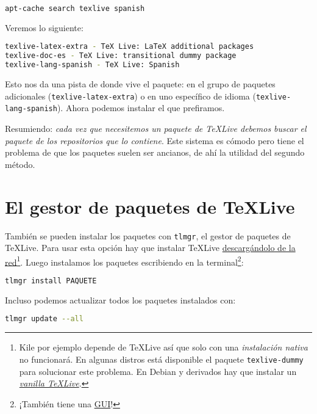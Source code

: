 \begin{lstlisting}[language=bash]
apt-cache search texlive spanish
\end{lstlisting}

Veremos lo siguiente:

\begin{lstlisting}[language=bash]
texlive-latex-extra - TeX Live: LaTeX additional packages
texlive-doc-es - TeX Live: transitional dummy package
texlive-lang-spanish - TeX Live: Spanish
\end{lstlisting}

Esto nos da una pista de donde vive el paquete: en el grupo de paquetes
adicionales (\lstinline!texlive-latex-extra!) o en uno específico de
idioma (\lstinline!texlive-lang-spanish!). Ahora podemos instalar el que
prefiramos.

Resumiendo: \emph{cada vez que necesitemos un paquete de TeXLive debemos
buscar el paquete de los repositorios que lo contiene}. Este sistema es
cómodo pero tiene el problema de que los paquetes suelen ser ancianos,
de ahí la utilidad del segundo método.

\section{El gestor de paquetes de
TeXLive}

También se pueden instalar los paquetes con \lstinline!tlmgr!, el gestor
de paquetes de TeXLive. Para usar esta opción hay que instalar TeXLive
\href{http://tug.org/texlive/acquire-netinstall.html}{descargándolo de
la red}\footnote{Kile por ejemplo depende de TeXLive así que solo con
  una \emph{instalación nativa} no funcionará. En algunas distros está
  disponible el paquete \lstinline!texlive-dummy! para solucionar este
  problema. En Debian y derivados hay que instalar un
  \href{http://tug.org/texlive/debian.html\#vanilla}{\emph{vanilla
  TeXLive}}.}. Luego instalamos los paquetes escribiendo en la
terminal\footnote{¡También tiene una
  \href{https://darrengoossens.wordpress.com/tag/gui/}{GUI}!}:

\begin{lstlisting}[language=bash]
tlmgr install PAQUETE
\end{lstlisting}

Incluso podemos actualizar todos los paquetes instalados con:

\begin{lstlisting}[language=bash]
tlmgr update --all
\end{lstlisting}

